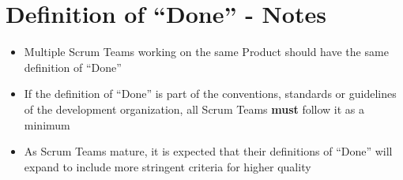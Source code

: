 \documentclass[a4paper,11pt,twocolumn]{article}
\begin{document}
\section*{Definition of ``Done'' - Notes}
\begin{itemize}
    \item Multiple Scrum Teams working on the same Product should have the same definition of ``Done''
    \item If the definition of ``Done'' is part of the conventions, standards or guidelines of the development organization, all Scrum Teams \textbf{must} follow it as a minimum
	\item As Scrum Teams mature, it is expected that their definitions of ``Done'' will expand to include more stringent criteria for higher quality
\end{itemize}

\nocite{*}


\end{document}
